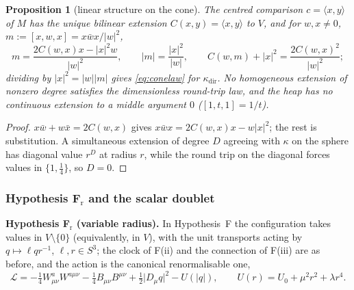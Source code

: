 \documentclass[aps,pra,onecolumn,superscriptaddress,nofootinbib,10pt]{revtex4-2}
\newtheorem{proposition}[theorem]{Proposition}
\theoremstyle{definition}
\theoremstyle{remark}
\newcommand{\ip}[2]{\langle #1,#2\rangle}
\newcommand{\hp}[3]{[#1,#2,#3]}
\begin{document}
\begin{proposition}[linear structure on the cone]\label{prop:conelinear}
The centred comparison $c=\ip xy$ of $M$ has the unique bilinear extension $C(x,y)=\ip xy$ to $V$, and for
$w,x\ne0$, $m:=\hp xwx=x\bar wx/\lvert w\rvert^2$,
\[
m=\frac{2C(w,x)x-\lvert x\rvert^2w}{\lvert w\rvert^2},\qquad \lvert m\rvert=\frac{\lvert x\rvert^2}{\lvert w\rvert},\qquad
C(w,m)+\lvert x\rvert^2=\frac{2C(w,x)^2}{\lvert w\rvert^2};
\]
dividing by $\lvert x\rvert^2=\lvert w\rvert\lvert m\rvert$ gives \eqref{eq:conelaw} for $\kappa_{\mathrm{dir}}$.  No homogeneous extension of
nonzero degree satisfies the dimensionless round-trip law, and the heap has no continuous extension
to a middle argument $0$ ($\hp1t1=1/t$).
\end{proposition}
\begin{proof}
$x\bar w+w\bar x=2C(w,x)$ gives $x\bar wx=2C(w,x)x-w\lvert x\rvert^2$; the rest is substitution.  A simultaneous
extension of degree $D$ agreeing with $\kappa$ on the sphere has diagonal value $r^D$ at radius $r$, while the
round trip on the diagonal forces values in $\{1,\tfrac14\}$, so $D=0$.
\end{proof}

\subsubsection{Hypothesis F$_{\mathrm r}$ and the scalar doublet}
\smallskip\noindent\textbf{Hypothesis F$_{\mathrm r}$ (variable radius).}\label{hyp:Fr}  In Hypothesis~F the configuration takes values
in $V\setminus\{0\}$ (equivalently, in $V$), with the unit transports acting by $q\mapsto\ell qr^{-1}$, $\ell,r\in S^3$; the clock
of F(ii) and the connection of F(iii) are as before, and the action is the canonical renormalisable one,
\begin{equation}\label{eq:radialaction}
\mathcal L=-\tfrac14W^a_{\mu\nu}W^{a\mu\nu}-\tfrac14B_{\mu\nu}B^{\mu\nu}+\tfrac12\lvert D_\mu q\rvert^2-U(\lvert q\rvert),\qquad
U(r)=U_0+\mu^2r^2+\lambda r^4 .
\end{equation}
\end{document}
